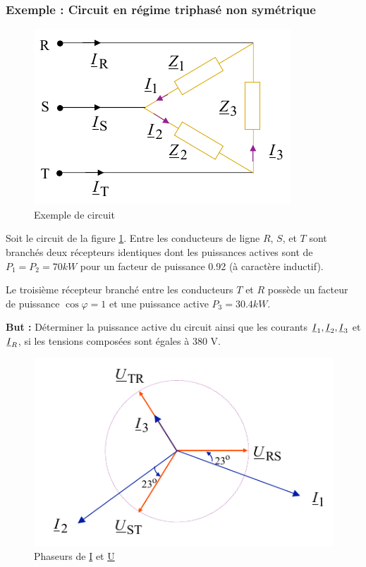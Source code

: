 \documentclass[12pt,a4paper]{article}
\newcommand{\ui}{\uline{I} }
\newcommand{\uu}{\uline{U} }
\begin{document}
\subsubsection[Exemple]{Exemple : Circuit en régime triphasé non symétrique}
\begin{figure}
	\centering
	\includegraphics[scale=0.5]{images/exemple_triphase_asym}
	\caption{Exemple de circuit}
	\label{fig: exemple circuit triphase asym}
\end{figure}
Soit le circuit de la figure \ref{fig: exemple circuit triphase asym}.  Entre les conducteurs de ligne $R$, $S$, et $T$ sont branchés deux récepteurs identiques dont les puissances actives sont de $P_1 = P_2 = 70 kW$ pour un facteur de puissance 0.92 (à caractère inductif). 

Le troisième récepteur branché entre les conducteurs $T$ et $R$ possède un facteur de puissance $\cos\varphi = 1$ et une puissance active $P_3 = 30.4 kW$. 

\textbf{But :} Déterminer la puissance active du circuit ainsi que les courants $\ui_1, \ui_2, \ui_3$ et $\ui_R$, si les tensions composées sont égales à 380 V.
\begin{figure}
	\centering
	\includegraphics[scale=0.6]{images/phaseurs_exemple_asym}
	\caption{Phaseurs de \ui et \uu}
	\label{sidefig: exemple phaseurs asym}
\end{figure}
\end{document}
